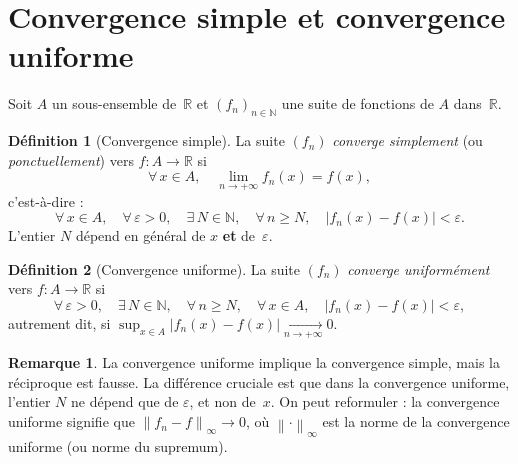 \documentclass[12pt,a4paper,openany]{book}
\theoremstyle{definition}
\newtheorem{definition}{Définition}[chapter]
\newtheorem{remarque}{Remarque}[chapter]
\newcommand{\N}{\mathbb{N}}
\newcommand{\R}{\mathbb{R}}
\newcommand{\eps}{\varepsilon}
\newcommand{\abs}[1]{\left\lvert #1 \right\rvert}
\newcommand{\norm}[1]{\left\lVert #1 \right\rVert}
\begin{document}
\section{Convergence simple et convergence uniforme}
\label{sec:cvs-cvu}

Soit $A$ un sous-ensemble de~$\R$ et $(f_n)_{n \in \N}$ une suite de fonctions de $A$ dans~$\R$.

\begin{definition}[Convergence simple]\label{def:convergence-simple}
  La suite $(f_n)$ \emph{converge simplement} (ou \emph{ponctuellement}) vers $f \colon A \to \R$ si
  \[
    \forall\, x \in A,\quad \lim_{n \to +\infty} f_n(x) = f(x),
  \]
  c'est-à-dire :
  \[
    \forall\, x \in A, \quad \forall\, \eps > 0, \quad \exists\, N \in \N, \quad \forall\, n \geqslant N, \quad \abs{f_n(x) - f(x)} < \eps.
  \]
  L'entier $N$ dépend en général de $x$ \textbf{et} de~$\eps$.
\end{definition}

\begin{definition}[Convergence uniforme]\label{def:convergence-uniforme}
  La suite $(f_n)$ \emph{converge uniformément} vers $f \colon A \to \R$ si
  \[
    \forall\, \eps > 0, \quad \exists\, N \in \N, \quad \forall\, n \geqslant N, \quad \forall\, x \in A, \quad \abs{f_n(x) - f(x)} < \eps,
  \]
  autrement dit, si $\displaystyle\sup_{x \in A}\abs{f_n(x) - f(x)} \xrightarrow[n \to +\infty]{} 0$.
\end{definition}

\begin{remarque}\label{rem:cvu-cvs}
  La convergence uniforme implique la convergence simple, mais la réciproque est fausse. La différence cruciale est que dans la convergence uniforme, l'entier $N$ ne dépend que de $\eps$, et non de~$x$. On peut reformuler : la convergence uniforme signifie que $\norm{f_n - f}_\infty \to 0$, où $\norm{\cdot}_\infty$ est la norme de la convergence uniforme (ou norme du supremum).
\end{remarque}
\end{document}
